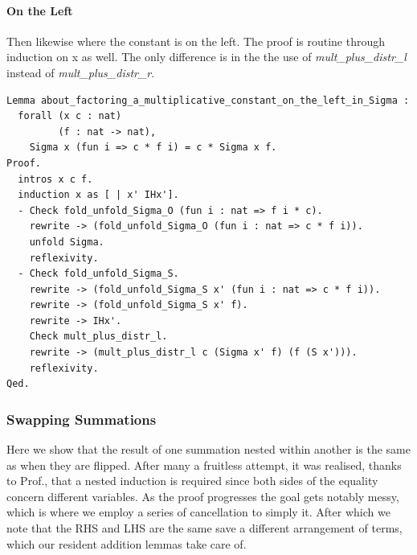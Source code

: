 \documentclass{article}
\begin{document}
\paragraph{On the Left}
Then likewise where the constant is on the left. The proof is routine through induction on x as well. The only difference is in the the use of \textit{mult\_plus\_distr\_l} instead of \textit{mult\_plus\_distr\_r}.

\begin{lstlisting}
Lemma about_factoring_a_multiplicative_constant_on_the_left_in_Sigma :
  forall (x c : nat)
         (f : nat -> nat),
    Sigma x (fun i => c * f i) = c * Sigma x f.
Proof.
  intros x c f.
  induction x as [ | x' IHx'].
  - Check fold_unfold_Sigma_O (fun i : nat => f i * c).
    rewrite -> (fold_unfold_Sigma_O (fun i : nat => c * f i)).
    unfold Sigma.
    reflexivity.
  - Check fold_unfold_Sigma_S.
    rewrite -> (fold_unfold_Sigma_S x' (fun i : nat => c * f i)).
    rewrite -> (fold_unfold_Sigma_S x' f).
    rewrite -> IHx'.
    Check mult_plus_distr_l.
    rewrite -> (mult_plus_distr_l c (Sigma x' f) (f (S x'))).
    reflexivity.
Qed.
\end{lstlisting}

\subsubsection{Swapping Summations}
Here we show that the result of one summation nested within another is the same as when they are flipped. After many a fruitless attempt, it was realised, thanks to Prof., that a nested induction is required since both sides of the equality concern different variables. As the proof progresses the goal gets notably messy, which is where we employ a series of cancellation to simply it. After which we note that the RHS and LHS are the same save a different arrangement of terms, which our resident addition lemmas take care of.
\end{document}
